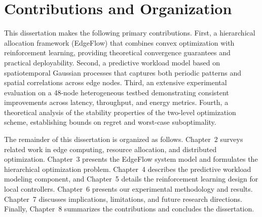 \section{Contributions and Organization}

This dissertation makes the following primary contributions. First, a hierarchical allocation framework (EdgeFlow) that combines convex optimization with reinforcement learning, providing theoretical convergence guarantees and practical deployability. Second, a predictive workload model based on spatiotemporal Gaussian processes that captures both periodic patterns and spatial correlations across edge nodes. Third, an extensive experimental evaluation on a 48-node heterogeneous testbed demonstrating consistent improvements across latency, throughput, and energy metrics. Fourth, a theoretical analysis of the stability properties of the two-level optimization scheme, establishing bounds on regret and worst-case suboptimality.

The remainder of this dissertation is organized as follows. Chapter~2 surveys related work in edge computing, resource allocation, and distributed optimization. Chapter~3 presents the EdgeFlow system model and formulates the hierarchical optimization problem. Chapter~4 describes the predictive workload modeling component, and Chapter~5 details the reinforcement learning design for local controllers. Chapter~6 presents our experimental methodology and results. Chapter~7 discusses implications, limitations, and future research directions. Finally, Chapter~8 summarizes the contributions and concludes the dissertation.
